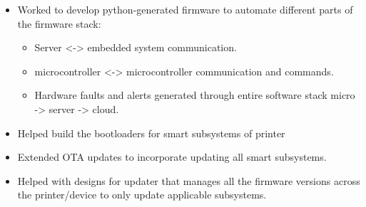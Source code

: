 \documentclass[10pt,a4paper,ragged2e,withhyper]{altacv}
\begin{document}
\divider

\begin{itemize}
\item Worked to develop python-generated firmware to automate different parts of the firmware stack:
	\begin{itemize}
	\item Server <-> embedded system communication.
	\item microcontroller <-> microcontroller communication and commands.
	\item Hardware faults and alerts generated through entire software stack micro -> server -> cloud.
	\end{itemize}
\end{itemize}

\divider

\begin{itemize}
\item Helped build the bootloaders for smart subsystems of printer
\item Extended OTA updates to incorporate updating all smart subsystems.
\item Helped with designs for updater that manages all the firmware versions across the printer/device to only update applicable subsystems.
\end{itemize}

\divider
\end{document}
